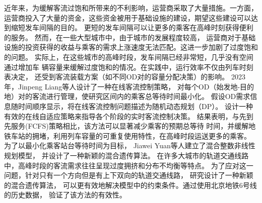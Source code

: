 近年来，为缓解客流过饱和所带来的不利影响，运营商采取了大量措施。一方面，
运营商投入了大量的资金，这些资金被用于基础设施的建设，期望这些建设可以达到缩短发车间隔的目的。
更短的发车间隔可以让更多的乘客在高峰时刻获得便利的服务。
然而，在一些大型城市中，由于城市的发展程度较高，
运营商对于基础设施的投资获得的收益与乘客的需求上涨速度无法匹配。这进一步加剧了过度饱和的问题。
实际上，在这些城市的高峰时段，发车间隔已经非常短，几乎没有空间通过增加车
辆容量来缓解过度饱和的情况。在实践中，运行效率不仅由列车时刻表决定，
还受到客流装载方案（如不同OD对的容量分配决策\cite{CHIERICI200499}）的影响。
2023年，Jinpeng Liang等人设计了一种在线客流控制策略\cite{LIANG2023102845}，
对每个OD（始发地-目的地）对的客流进行管理，使研究区间内的乘客总等待时间最小化。
假设OD需求信息随时间顺序显示，将在线客流控制问题描述为随机动态规划（DP）。
设计一种有效的在线自适应策略来指导各个阶段的实时客流控制决策。
结果表明，与先到先服务(FCFS)策略相比，该方法可以显著减少乘客的预期总等待
时间，并缓解地铁车站的拥堵，利用列车容量的可重复使用特性，在高峰时段运送更多的乘客。
为了以最小化乘客站台等待时间为目标， Jiawei Yuan等人建立了混合整数非线性规划模型，
并设计了一种新颖的混合遗传算法\cite{YUAN2022855}。
在许多大城市的轨道交通线路中，高峰时段的客流需求往往呈现过度拥挤和分布不均衡等特点。
为了应对这一问题，针对只有一个方向但是有上下双向的轨道交通线路，
研究设计了一种新颖的混合遗传算法，
可以更有效地解决模型中的约束条件。通过使用北京地铁6号线的历史数据，
验证了该方法的有效性。


